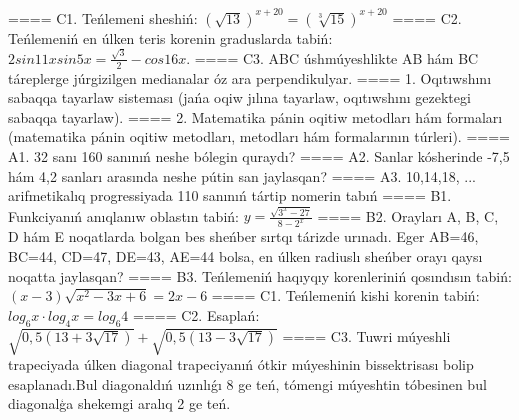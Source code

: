 ====
C1. Teńlemeni sheshiń: \((\sqrt{13}) ^{x + 20} = (\sqrt[3]{15}) ^{x + 20}\)
====
C2. Teńlemeniń en úlken teris korenin graduslarda tabiń: \(2sin11xsin5x = \frac{\sqrt{3}}{2} - cos16x\).
====
C3. ABC úshmúyeshlikte AB hám BC táreplerge júrgizilgen medianalar óz ara perpendikulyar.
====
1. Oqıtıwshını sabaqqa tayarlaw sisteması (jańa oqiw jılına tayarlaw, oqıtıwshını gezektegi sabaqqa tayarlaw).
====
2. Matematika pánin oqitiw metodları hám formaları (matematika pánin oqitiw metodları, metodları hám formalarının túrleri).
====
A1. 32 sanı 160 sanınıń neshe bólegin quraydı?
====
A2. Sanlar kósherinde -7,5 hám 4,2 sanları arasında neshe pútin san jaylasqan?
====
A3. 10,14,18, ... arifmetikalıq progressiyada 110 sanınıń tártip nomerin tabıń
====
B1. Funkciyanıń anıqlanıw oblastın tabiń: \(y = \frac{\sqrt{3^{x} - 27}}{8 - 2^{x}}\)
====
B2. Orayları A, B, C, D hám E noqatlarda bolgan bes sheńber sırtqı tárizde urınadı. Eger AB=46, BC=44, CD=47, DE=43, AE=44 bolsa, en úlken radiuslı sheńber orayı qaysı noqatta jaylasqan?
====
B3. Teńlemeniń haqıyqıy korenleriniń qosındısın tabiń: \((x-3) \sqrt{x^{2} - 3x + 6} = 2x - 6\)
====
C1. Teńlemeniń kishi korenin tabiń: \(log_{6}x \cdot log_{4}x = log_{6}4\)
====
C2. Esaplań: \(\sqrt{0,5 (13 + 3\sqrt{17}) } + \sqrt{0,5 (13 - 3\sqrt{17}) }\)
====
C3. Tuwri múyeshli trapeciyada úlken diagonal trapeciyanıń ótkir múyeshinin bissektrisası bolip esaplanadı.Bul diagonaldıń uzınlıǵı 8 ge teń, tómengi múyeshtin tóbesinen bul diagonalģa shekemgi aralıq 2 ge teń.